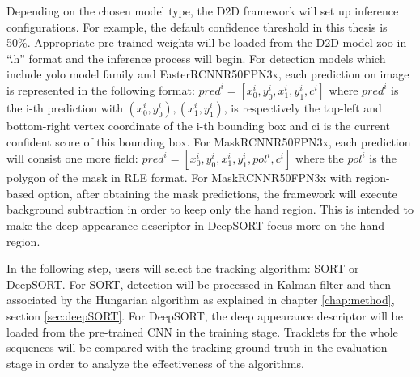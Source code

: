 Depending on the chosen model type, the D2D framework will set up inference configurations. For example, the default confidence threshold in this thesis is 50\%. Appropriate pre-trained weights will be loaded from the D2D model zoo in “.h” format and the inference process will begin. For detection models which include yolo model family and FasterRCNNR50FPN3x, each prediction on image is represented in the following format: \(pred^i = [x_0^i, y_0^i, x_1^i, y_1^i, c^i]\) where \(pred^i\) is the i-th prediction with \((x_0^i, y_0^i),  (x_1^i, y_1^i)\), is respectively the top-left and bottom-right vertex coordinate of the i-th bounding box and ci is the current confident score of this bounding box. For MaskRCNNR50FPN3x, each prediction will consist one more field: \(pred^i = [x_0^i, y_0^i, x_1^i, y_1^i, pol^i, c^i]\) where the \(pol^i\) is the polygon of the mask in RLE format. For MaskRCNNR50FPN3x with region-based option, after obtaining the mask predictions, the framework will execute background subtraction in order to keep only the hand region. This is intended to make the deep appearance descriptor in DeepSORT focus more on the hand region.

In the following step, users will select the tracking algorithm: SORT or DeepSORT. For SORT, detection will be processed in Kalman filter and then associated by the Hungarian algorithm as explained in chapter \ref{chap:method}, section \ref{sec:deepSORT}. For DeepSORT, the deep appearance descriptor will be loaded from the pre-trained CNN in the training stage. Tracklets for the whole sequences will be compared with the tracking ground-truth in the evaluation stage in order to analyze the effectiveness of the algorithms.

